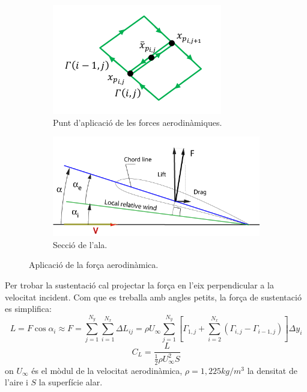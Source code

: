 \begin{figure}[H]
\centering
\begin{subfigure}{.5\textwidth}
  \centering
  \includegraphics[width=.7\linewidth]{./plots/xp}
  \caption{Punt d'aplicació de les forces aerodinàmiques.}
  \label{xp}
\end{subfigure}%
\begin{subfigure}{.5\textwidth}
  \centering
  \includegraphics[width=.93\linewidth]{./plots/Induced_effective}
  \caption{Secció de l'ala.}
  \label{fig:wingSec}
\end{subfigure}
\caption{Aplicació de la força aerodinàmica.}
\end{figure}
Per trobar la sustentació cal projectar la força en l'eix perpendicular a la velocitat incident. Com que es treballa amb angles petits, la força de sustentació es simplifica:
\begin{equation}
L=F\cos{\alpha_i} \approx F = \sum_{j=1}^{N_{y}}\sum_{i=1}^{N_{x}}\Delta L_{ij}=\rho U_{\infty}\sum_{j=1}^{N_{y}}\left[\Gamma_{1,j}+\sum_{i=2}^{N_{x}}\left(\Gamma_{i,j}-\Gamma_{i-1,j}\right)\right]\Delta y_{i}
\end{equation}
\begin{equation}
C_{L}=\frac{L}{\frac{1}{2}\rho U_{\infty}^{2}S}
\end{equation}
on $U_{\infty}$ és el mòdul de la velocitat aerodinàmica, $\rho=1,225 kg/m^{3}$ la densitat de l'aire i $S$ la superfície alar.

